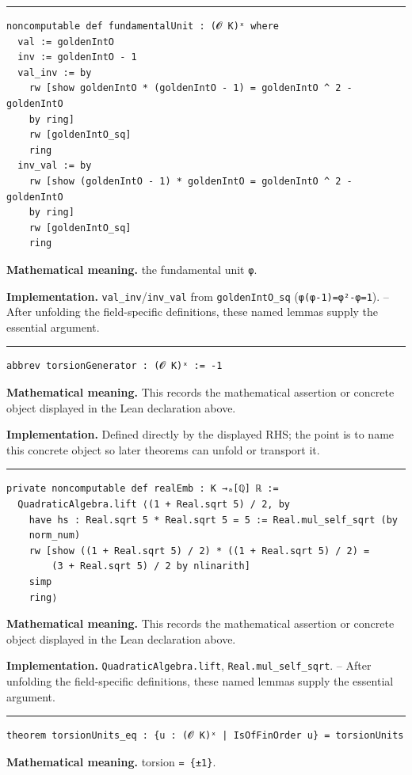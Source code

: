 \documentclass[UTF8,a4paper,11pt,fontset=fandol]{ctexart}
\theoremstyle{definition}
\newcommand{\statementsep}{\par\medskip\hrule\medskip}
\begin{document}
\statementsep
\begin{verbatim}
noncomputable def fundamentalUnit : (𝓞 K)ˣ where
  val := goldenIntO
  inv := goldenIntO - 1
  val_inv := by
    rw [show goldenIntO * (goldenIntO - 1) = goldenIntO ^ 2 - goldenIntO
    by ring]
    rw [goldenIntO_sq]
    ring
  inv_val := by
    rw [show (goldenIntO - 1) * goldenIntO = goldenIntO ^ 2 - goldenIntO
    by ring]
    rw [goldenIntO_sq]
    ring
\end{verbatim}
\noindent\textbf{Mathematical meaning.} the fundamental unit \texttt{φ}.\par
\noindent\textbf{Implementation.} \texttt{val\_\allowbreak{}inv}/\texttt{inv\_\allowbreak{}val} from \texttt{goldenIntO\_\allowbreak{}sq} (\texttt{φ(φ-1)=φ²-φ=1}). -- After unfolding the field-specific definitions, these named lemmas supply the essential argument.\par
\statementsep
\begin{verbatim}
abbrev torsionGenerator : (𝓞 K)ˣ := -1
\end{verbatim}
\noindent\textbf{Mathematical meaning.} This records the mathematical assertion or concrete object displayed in the Lean declaration above.\par
\noindent\textbf{Implementation.} Defined directly by the displayed RHS; the point is to name this concrete object so later theorems can unfold or transport it.\par
\statementsep
\begin{verbatim}
private noncomputable def realEmb : K →ₐ[ℚ] ℝ :=
  QuadraticAlgebra.lift ⟨(1 + Real.sqrt 5) / 2, by
    have hs : Real.sqrt 5 * Real.sqrt 5 = 5 := Real.mul_self_sqrt (by
    norm_num)
    rw [show ((1 + Real.sqrt 5) / 2) * ((1 + Real.sqrt 5) / 2) =
        (3 + Real.sqrt 5) / 2 by nlinarith]
    simp
    ring⟩
\end{verbatim}
\noindent\textbf{Mathematical meaning.} This records the mathematical assertion or concrete object displayed in the Lean declaration above.\par
\noindent\textbf{Implementation.} \texttt{QuadraticAlgebra.\allowbreak{}lift}, \texttt{Real.\allowbreak{}mul\_\allowbreak{}self\_\allowbreak{}sqrt}. -- After unfolding the field-specific definitions, these named lemmas supply the essential argument.\par
\statementsep
\begin{verbatim}
theorem torsionUnits_eq : {u : (𝓞 K)ˣ | IsOfFinOrder u} = torsionUnits
\end{verbatim}
\noindent\textbf{Mathematical meaning.} torsion \texttt{= \{±1\}}.\par
\end{document}
